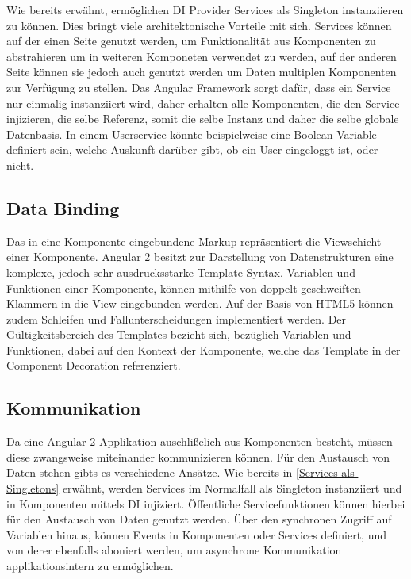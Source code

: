Wie bereits erwähnt, ermöglichen \ac{DI} Provider Services als Singleton instanziieren zu können.
Dies bringt viele architektonische Vorteile mit sich. Services können auf der einen Seite genutzt werden,
um Funktionalität aus Komponenten zu abstrahieren um in weiteren Komponeten verwendet zu werden,
auf der anderen Seite können sie jedoch auch genutzt werden um Daten multiplen Komponenten zur Verfügung zu stellen.
Das Angular Framework sorgt dafür, dass ein Service nur einmalig instanziiert wird, daher erhalten alle
Komponenten, die den Service injizieren, die selbe Referenz, somit die selbe Instanz und daher die selbe globale Datenbasis.
In einem Userservice könnte beispielweise eine Boolean Variable definiert sein, welche Auskunft darüber gibt,
ob ein User eingeloggt ist, oder nicht. \cite[308]{Angular2}


\subsection{Data Binding}
Das in eine Komponente eingebundene Markup repräsentiert die Viewschicht einer Komponente.
Angular 2 besitzt zur Darstellung von Datenstrukturen eine komplexe, jedoch sehr ausdrucksstarke Template Syntax.
Variablen und Funktionen einer Komponente, können mithilfe von doppelt geschweiften Klammern in die View eingebunden werden.
Auf der Basis von HTML5 können zudem Schleifen und Fallunterscheidungen implementiert werden.
Der Gültigkeitsbereich des Templates bezieht sich, bezüglich Variablen und Funktionen, dabei auf den Kontext der Komponente,
welche das Template in der Component Decoration referenziert. \cite{Templ78:online}

\vspace{1cm}

\vspace{1cm}

\subsection{Kommunikation}

Da eine Angular 2 Applikation auschlißelich aus Komponenten besteht, müssen diese zwangsweise miteinander
kommunizieren können. Für den Austausch von Daten stehen gibts es verschiedene Ansätze.
Wie bereits in \ref{Services-als-Singletons} erwähnt, werden Services im Normalfall als Singleton
instanziiert und in Komponenten mittels \ac{DI} injiziert. Öffentliche Servicefunktionen können hierbei für den
Austausch von Daten genutzt werden. Über den synchronen Zugriff auf Variablen hinaus,
können Events in Komponenten oder Services definiert, und von derer ebenfalls aboniert werden,
um asynchrone Kommunikation applikationsintern zu ermöglichen.

